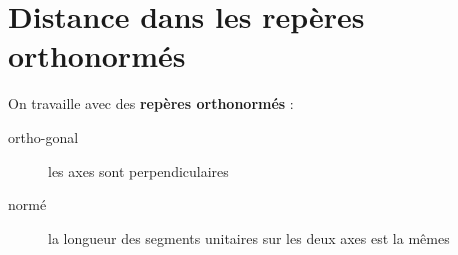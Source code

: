 \documentclass[main.tex]{subfiles}
\begin{document}
%	 
\newpage 
\section{Distance dans les repères orthonormés}
On travaille avec des \textbf{repères orthonormés} : 
\begin{description}
	\item[ortho-gonal]  les axes sont perpendiculaires
	\item[normé] la longueur des segments unitaires sur les deux axes est la mêmes
\end{description}
\end{document}
